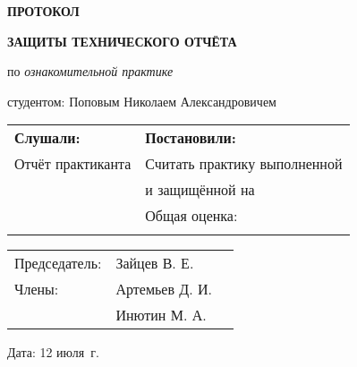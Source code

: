 \begin{center}
    \bfseries{\large ПРОТОКОЛ }
    
    \vspace{12pt}
    
    \bfseries{ЗАЩИТЫ ТЕХНИЧЕСКОГО ОТЧЁТА}
    \end{center}
    \noindent
    по {\itshape ознакомительной практике}
    
    \vspace{8pt}
    \noindent
    студентом:
    \noindent
    Поповым Николаем Александровичем
    
    \begin{longtable}{p{7cm}|p{11cm}}
        \hline
        {\bfseries Слушали:} & {\bfseries Постановили:}  \\
        Отчёт практиканта & Считать практику выполненной \\
        & и защищённой на \\
        \rule{0pt}{450pt} & Общая оценка: \underline{\hspace{2in}}\\
        \rule{0pt}{15pt} & \\
        \hline
    \end{longtable}
    
    \vfill
    
    \noindent\begin{tabular}{@{}l l l}
    Председатель: & Зайцев В. Е. & \underline{\hspace{2in}} \\
    Члены: & Артемьев Д. И. & \underline{\hspace{2in}} \\
    & Инютин М. А. & \underline{\hspace{2in}}
    \end{tabular}
    \vspace{12pt}
    
    \noindent
    Дата: 12 июля \the\year\,г.\hspace{50pt}
    
    \pagebreak